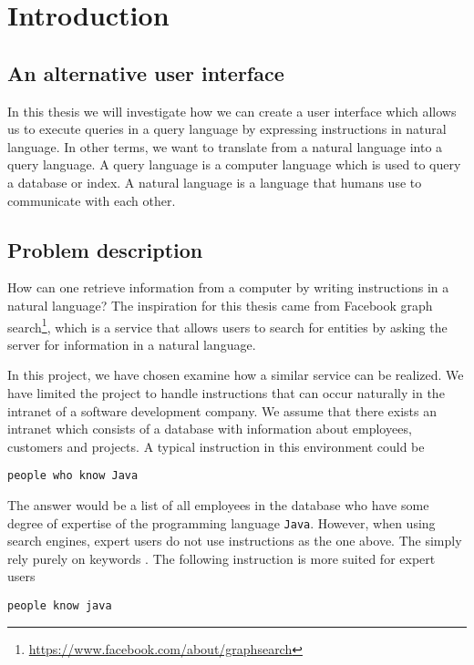 \chapter{Introduction}\label{ch:introduction}
\section{An alternative user interface}
In this thesis we will investigate how we can create a user interface which allows us to execute queries in a query language by expressing instructions in natural language. In other terms, we want to translate from a natural language into a query language. A query language is a computer language which is used to query a database or index. A natural language is a language that humans use to communicate with each other.

\section{Problem description\label{sec:problem-description}}
How can one retrieve information from a computer by writing instructions in a natural language? The inspiration for this thesis came from Facebook graph search\footnote{\url{https://www.facebook.com/about/graphsearch}}, which is a service that allows users to search for entities by asking the server for information in a natural language.

In this project, we have chosen examine how a similar service can be realized. We have limited the project to handle instructions that can occur naturally in the intranet of a software development company. We assume that there exists an intranet which consists of a database with information about employees, customers and projects. A typical instruction in this environment could be

\begin{verbatim}
people who know Java
\end{verbatim}

The answer would be a list of all employees in the database who have some degree of expertise of the programming language \texttt{Java}. However, when using search engines, expert users do not use instructions as the one above. The simply rely purely on keywords \cite{mayer:2007}. The following instruction is more suited for expert users

\begin{verbatim}
people know java
\end{verbatim}

